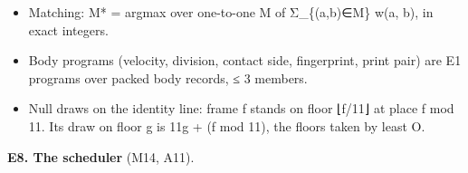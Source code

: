 \begin{itemize}
\begin{itemize}
\item Z = Σ\_\allowbreak{}α Π\_\allowbreak{}s ω(s, α(s)), α injective with ∅ allowed, is the permanent of [ω(s, t) | diag ω(s, ∅)];
\item P(s → t) = Z\_\allowbreak{}\{s→t\}/Z, and it factors over the support's components;
\item bounds: ≤ 2\textasciicircum{}16 arrangements, ≤ 64 targets, 16 limbs.
\end{itemize}
\item Matching: M* = argmax over one-to-one M of Σ\_\allowbreak{}\{(a,b)∈M\} w(a, b), in exact integers.
\item Body programs (velocity, division, contact side, fingerprint, print pair) are E1 programs over packed body records, ≤ 3 members.
\item Null draws on the identity line: frame f stands on floor ⌊f/11⌋ at place f mod 11. Its draw on floor g is 11g + (f mod 11), the floors taken by least O.
\end{itemize}

\textbf{E8. The scheduler} (M14, A11).

